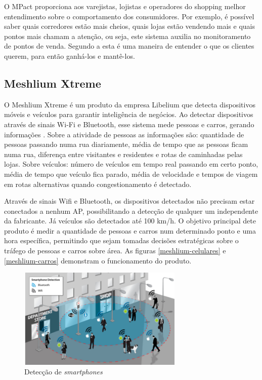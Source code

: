 O MPact proporciona aos varejistas, lojistas e operadores do shopping melhor entendimento sobre o comportamento dos consumidores. Por exemplo, é
possível saber quais corredores estão mais cheios, quais lojas estão vendendo mais e quais pontos mais chamam a atenção, ou seja, este sistema
auxilia no monitoramento de pontos de venda. Segundo a  esta é uma maneira de entender o que os clientes querem,
para então ganhá-los e mantê-los.

\subsection{Meshlium Xtreme}
O Meshlium Xtreme é um produto da empresa Libelium que detecta dispositivos móveis e veículos para garantir inteligência de negócios. Ao detectar dispositivos
através de sinais Wi-Fi e Bluetooth, esse sistema mede pessoas e carros, gerando informações \cite{libelium}. Sobre a atividade de pessoas as informações
são: quantidade
de pessoas passando numa rua diariamente, média de tempo que as pessoas ficam numa rua, diferença entre visitantes e residentes e rotas
de caminhadas pelas lojas. Sobre veículos: número de veículos em tempo real passando em certo ponto, média de tempo que veículo fica parado,
média de velocidade e tempos de viagem em rotas alternativas quando congestionamento é detectado.

Através de sinais Wifi e Bluetooth, os dispositivos detectados não precisam estar conectados a nenhum AP, possibilitando a detecção de qualquer um
independente da fabricante. Já veículos são detectados até 100 km/h. O objetivo principal dete produto é medir a quantidade de pessoas e carros
num determinado ponto e uma hora específica, permitindo que sejam tomadas decisões estratégicas sobre o tráfego de pessoas e carros sobre área.
As figuras \autoref{meshlium-celulares} e \autoref{meshlium-carros} demonstram o funcionamento do produto.

\begin{figure}[htb]
	\caption{\label{meshlium-celulares}Detecção de \emph{smartphones}}
	\begin{center}
		\includegraphics[width=0.70\textwidth]{img/meshlium-celulares.png}
	\end{center}
\end{figure}


